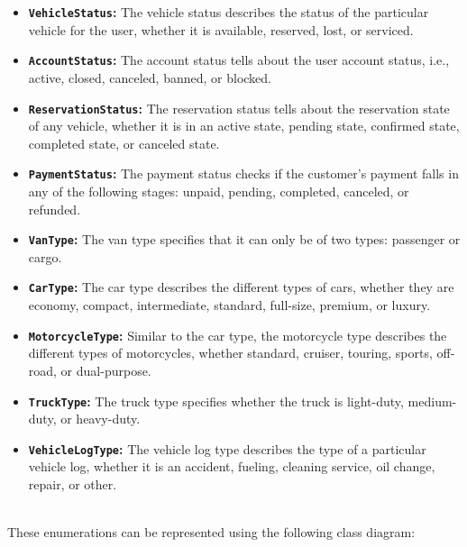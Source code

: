 \begin{itemize}
\item
\protect{}\label{L7Q4_d--pCzFdvsuSYz9G}
\textbf{\texttt{VehicleStatus}:} The vehicle status describes the status of the particular vehicle for the user, whether it is available, reserved, lost, or serviced.
\item
\protect{}\label{J3Mj7FmXUAJUtL10XBcrY}
\textbf{\texttt{AccountStatus}:} The account status tells about the user account status, i.e., active, closed, canceled, banned, or blocked.
\item
\protect{}\label{MLKloIqzHmWNOso64XpKK}
\textbf{\texttt{ReservationStatus}:} The reservation status tells about the reservation state of any vehicle, whether it is in an active state, pending state, confirmed state, completed state, or canceled state.
\item
\protect{}\label{9R5vDWLJ3eFdh9YPLb5QL}
\textbf{\texttt{PaymentStatus}:} The payment status checks if the customer's payment falls in any of the following stages: unpaid, pending, completed, canceled, or refunded.
\item
\protect{}\label{zdp2ZvpuWCZVhqQm8xlND}
\textbf{\texttt{VanType}:} The van type specifies that it can only be of two types: passenger or cargo.
\item
\protect{}\label{NWXwlsVfKwYDtK0gGv68p}
\textbf{\texttt{CarType}:} The car type describes the different types of cars, whether they are economy, compact, intermediate, standard, full-size, premium, or luxury.
\item
\protect{}\label{pyxfocYUg7Y6A1WtyGoEq}
\textbf{\texttt{MotorcycleType}:} Similar to the car type, the motorcycle type describes the different types of motorcycles, whether standard, cruiser, touring, sports, off-road, or dual-purpose.
\item
\protect{}\label{xtFuQkqwtVU0_jWg9cz5F}
\textbf{\texttt{TruckType}:} The truck type specifies whether the truck is light-duty, medium-duty, or heavy-duty.
\item
\protect{}\label{_MxNjZt9g6Ae8E30ySwJQ}
\textbf{\texttt{VehicleLogType}:} The vehicle log type describes the type of a particular vehicle log, whether it is an accident, fueling, cleaning service, oil change, repair, or other.
\end{itemize}
\\
These enumerations can be represented using the following class diagram:

